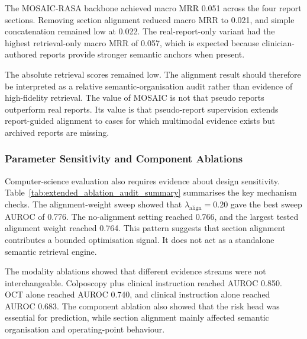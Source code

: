 \documentclass[11pt, a4paper]{article}
\theoremstyle{plain}
\theoremstyle{definition}
\begin{document}
The MOSAIC-RASA backbone achieved macro MRR 0.051 across the four report sections. Removing section alignment reduced macro MRR to 0.021, and simple concatenation remained low at 0.022. The real-report-only variant had the highest retrieval-only macro MRR of 0.057, which is expected because clinician-authored reports provide stronger semantic anchors when present.

The absolute retrieval scores remained low. The alignment result should therefore be interpreted as a relative semantic-organisation audit rather than evidence of high-fidelity retrieval. The value of MOSAIC is not that pseudo reports outperform real reports. Its value is that pseudo-report supervision extends report-guided alignment to cases for which multimodal evidence exists but archived reports are missing.

\subsubsection{Parameter Sensitivity and Component Ablations}
\label{subsec:parameter_component_results}

Computer-science evaluation also requires evidence about design sensitivity. Table~\ref{tab:extended_ablation_audit_summary} summarises the key mechanism checks. The alignment-weight sweep showed that \(\lambda_{\mathrm{align}}=0.20\) gave the best sweep AUROC of 0.776. The no-alignment setting reached 0.766, and the largest tested alignment weight reached 0.764. This pattern suggests that section alignment contributes a bounded optimisation signal. It does not act as a standalone semantic retrieval engine.

The modality ablations showed that different evidence streams were not interchangeable. Colposcopy plus clinical instruction reached AUROC 0.850. OCT alone reached AUROC 0.740, and clinical instruction alone reached AUROC 0.683. The component ablation also showed that the risk head was essential for prediction, while section alignment mainly affected semantic organisation and operating-point behaviour.
\end{document}

